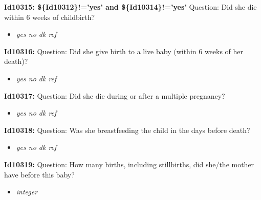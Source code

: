 \documentclass{article}%
\begin{document}
\textbf{Id10315: \$\{Id10312\}!='yes' and  \$\{Id10314\}!='yes'\newline%
}%
Question: Did she die within 6 weeks of childbirth?\newline%
%
\begin{itemize}%
\item%
\textit{yes\newline%
 no\newline%
 dk\newline%
 ref\newline%
}%
\end{itemize}%
\textbf{Id10316: \newline%
}%
Question: Did she give birth to a live baby (within 6 weeks of her death)?\newline%
%
\begin{itemize}%
\item%
\textit{yes\newline%
 no\newline%
 dk\newline%
 ref\newline%
}%
\end{itemize}%
\textbf{Id10317: \newline%
}%
Question: Did she die during or after a multiple pregnancy?\newline%
%
\begin{itemize}%
\item%
\textit{yes\newline%
 no\newline%
 dk\newline%
 ref\newline%
}%
\end{itemize}%
\textbf{Id10318: \newline%
}%
Question: Was she breastfeeding the child in the days before death?\newline%
%
\begin{itemize}%
\item%
\textit{yes\newline%
 no\newline%
 dk\newline%
 ref\newline%
}%
\end{itemize}%
\textbf{Id10319: \newline%
}%
Question: How many births, including stillbirths, did she/the mother have before this baby?\newline%
%
\begin{itemize}%
\item%
\textit{integer\newline%
}%
\end{itemize}%
\end{document}
